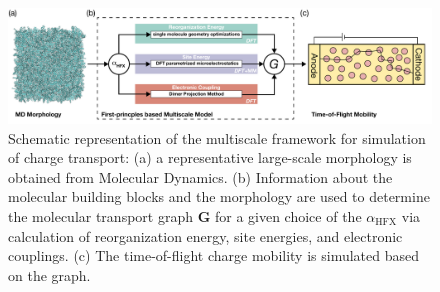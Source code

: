 \documentclass[%
 reprint,
superscriptaddress,
 amsmath,amssymb,
 aps,
prb,
floatfix
]{revtex4-2}
\newcommand{\ahfx}{\ensuremath{\alpha_\text{HFX}}\xspace}
\begin{document}
\begin{figure}[tbp]
  \centering
  \includegraphics[width=\linewidth]{figs/MSM2.pdf}
  \caption{Schematic representation of the multiscale framework for simulation of charge transport: (a) a representative large-scale morphology is obtained from Molecular Dynamics. (b) Information about the molecular building blocks and the morphology are used to determine the molecular transport graph $\mathbf{G}$ for a given choice of the \ahfx via calculation of reorganization energy, site energies, and electronic couplings. (c) The time-of-flight charge mobility is simulated based on the graph.}
  \label{fig:MSM}
\end{figure}
\end{document}
